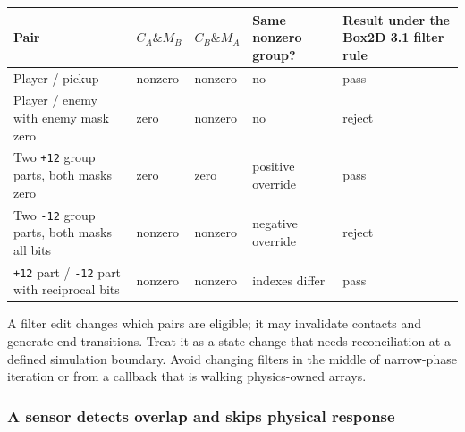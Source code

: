 {\def\LTcaptype{none} %
\begin{longtable}[]{@{}
  >{\raggedright\arraybackslash}p{}
  >{\raggedleft\arraybackslash}p{}
  >{\raggedleft\arraybackslash}p{}
  >{\raggedright\arraybackslash}p{}
  >{\raggedright\arraybackslash}p{}@{}}
\toprule\noalign{}
\begin{minipage}[b]{\linewidth}\raggedright
Pair
\end{minipage} & \begin{minipage}[b]{\linewidth}\raggedleft
\(C_A \& M_B\)
\end{minipage} & \begin{minipage}[b]{\linewidth}\raggedleft
\(C_B \& M_A\)
\end{minipage} & \begin{minipage}[b]{\linewidth}\raggedright
Same nonzero group?
\end{minipage} & \begin{minipage}[b]{\linewidth}\raggedright
Result under the Box2D 3.1 filter rule
\end{minipage} \\
\midrule\noalign{}
\endhead
\bottomrule\noalign{}
\endlastfoot
Player / pickup & nonzero & nonzero & no & pass \\
Player / enemy with enemy mask zero & zero & nonzero & no & reject \\
Two \texttt{+12} group parts, both masks zero & zero & zero & positive override & pass \\
Two \texttt{-12} group parts, both masks all bits & nonzero & nonzero & negative override & reject \\
\texttt{+12} part / \texttt{-12} part with reciprocal bits & nonzero & nonzero & indexes differ & pass \\
\end{longtable}
}

A filter edit changes which pairs are eligible; it may invalidate contacts and generate end transitions. Treat it as a state change that needs reconciliation at a defined simulation boundary. Avoid changing filters in the middle of narrow-phase iteration or from a callback that is walking physics-owned arrays.

\subsubsection{A sensor detects overlap and skips physical response}\label{05-engine-i-ch017-a-sensor-detects-overlap-and-skips-physical-response}

